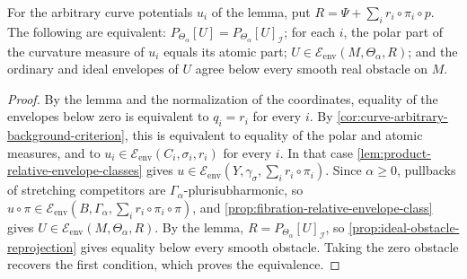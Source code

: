 \begin{corollary}\label{cor:general-auxiliary-all-obstacle-criterion}\label{cor:auxiliary-product-all-obstacle-criterion}
For the arbitrary curve potentials $u_i$ of the lemma, put $R=\Psi+\sum_ir_i\circ\pi_i\circ p$. The following are equivalent: $P_{\Theta_\alpha}[U]=P_{\Theta_\alpha}[U]_{\mathcal I}$; for each $i$, the polar part of the curvature measure of $u_i$ equals its atomic part; $U\in\mathcal E_{\mathrm{env}}(M,\Theta_\alpha,R)$; and the ordinary and ideal envelopes of $U$ agree below every smooth real obstacle on $M$.
\end{corollary}
\begin{proof}
By the lemma and the normalization of the coordinates, equality of the envelopes below zero is equivalent to $q_i=r_i$ for every $i$. By \cref{cor:curve-arbitrary-background-criterion}, this is equivalent to equality of the polar and atomic measures, and to $u_i\in\mathcal E_{\mathrm{env}}(C_i,\sigma_i,r_i)$ for every $i$. In that case \cref{lem:product-relative-envelope-classes} gives $u\in\mathcal E_{\mathrm{env}}(Y,\gamma_\sigma,\sum_ir_i\circ\pi_i)$. Since $\alpha\geq0$, pullbacks of stretching competitors are $\Gamma_\alpha$-plurisubharmonic, so $u\circ\pi\in\mathcal E_{\mathrm{env}}(B,\Gamma_\alpha,\sum_ir_i\circ\pi_i\circ\pi)$, and \cref{prop:fibration-relative-envelope-class} gives $U\in\mathcal E_{\mathrm{env}}(M,\Theta_\alpha,R)$. By the lemma, $R=P_{\Theta_\alpha}[U]_{\mathcal I}$, so \cref{prop:ideal-obstacle-reprojection} gives equality below every smooth obstacle. Taking the zero obstacle recovers the first condition, which proves the equivalence.
\end{proof}

